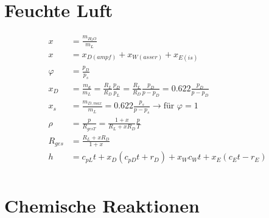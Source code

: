\documentclass[twocolumn]{article}
\begin{document}
\begin{multicols}{2}
%
                                                               
\section{Feuchte Luft}


\begin{align*}
	x &= \frac{m_{H_2O}}{m_L} \\
	x &= x_{D(ampf)} + x_{W(asser)} + x_{E(is)}  \\
	\varphi & = \frac{p_D}{p_s} \\
	x_D &= \frac{m_d}{m_L} = \frac{R_L}{R_D}\frac{p_D}{p_L} = \frac{R_L}{R_D} \frac{p_D}{p-p_D} = 0.622 \frac{p_D}{p-p_D} \\
	x_s &= \frac{m_{D,max}}{m_L} = 0.622 \frac{p_s}{p-p_s} \rightarrow \text{für $\varphi = 1$}\\
	\rho &= \frac{p}{R_{ges T}} = \frac{1 + x}{R_L + xR_D} \frac{p}{T} \\
	R_{ges} &= \frac{R_L + xR_D}{1+x} \\
	h &= c_{pL} t + x_D(c_{pD}t + r_D) + x_W c_W t + x_E (c_E t - r_E) \\
\end{align*}

	\section{Chemische Reaktionen}


\end{multicols}
\end{document}
